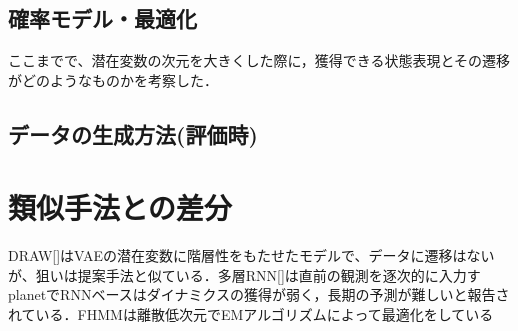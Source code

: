 \subsection{確率モデル・最適化}

ここまでで、潜在変数の次元を大きくした際に，獲得できる状態表現とその遷移がどのようなものかを考察した．


\subsection{データの生成方法(評価時)}
\section{類似手法との差分}
DRAW[]はVAEの潜在変数に階層性をもたせたモデルで、データに遷移はないが、狙いは提案手法と似ている．多層RNN[]は直前の観測を逐次的に入力すplanetでRNNベースはダイナミクスの獲得が弱く，長期の予測が難しいと報告されている．FHMMは離散低次元でEMアルゴリズムによって最適化をしている


